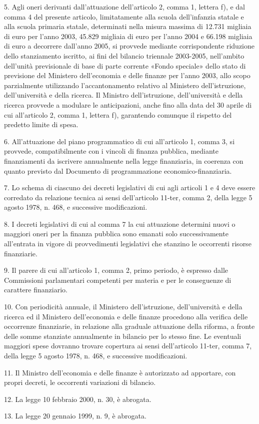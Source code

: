 5. Agli oneri derivanti dall'attuazione dell'articolo 2, comma 1, lettera f), e dal comma 4 del presente articolo, limitatamente alla scuola dell'infanzia statale e alla scuola primaria statale, determinati nella misura massima di 12.731 migliaia di euro per l'anno 2003, 45.829 migliaia di euro per l'anno 2004 e 66.198 migliaia di euro a decorrere dall'anno 2005, si provvede mediante corrispondente riduzione dello stanziamento iscritto, ai fini del bilancio triennale 2003-2005, nell'ambito dell'unità previsionale di base di parte corrente «Fondo speciale» dello stato di previsione del Ministero dell'economia e delle finanze per l'anno 2003, allo scopo parzialmente utilizzando l'accantonamento relativo al Ministero dell'istruzione, dell'università e della ricerca. Il Ministro dell'istruzione, dell'università e della ricerca provvede a modulare le anticipazioni, anche fino alla data del 30 aprile di cui all'articolo 2, comma 1, lettera f), garantendo comunque il rispetto del predetto limite di spesa.

6. All'attuazione del piano programmatico di cui all'articolo 1, comma 3, si provvede, compatibilmente con i vincoli di finanza pubblica, mediante finanziamenti da iscrivere annualmente nella legge finanziaria, in coerenza con quanto previsto dal Documento di programmazione economico-finanziaria.

7. Lo schema di ciascuno dei decreti legislativi di cui agli articoli 1 e 4 deve essere corredato da relazione tecnica ai sensi dell'articolo 11-ter, comma 2, della legge 5 agosto 1978, n. 468, e successive modificazioni.

8. I decreti legislativi di cui al comma 7 la cui attuazione determini nuovi o maggiori oneri per la finanza pubblica sono emanati solo successivamente all'entrata in vigore di provvedimenti legislativi che stanzino le occorrenti risorse finanziarie.

9. Il parere di cui all'articolo 1, comma 2, primo periodo, è espresso dalle Commissioni parlamentari competenti per materia e per le conseguenze di carattere finanziario.

10. Con periodicità annuale, il Ministero dell'istruzione, dell'università e della ricerca ed il Ministero dell'economia e delle finanze procedono alla verifica delle occorrenze finanziarie, in relazione alla graduale attuazione della riforma, a fronte delle somme stanziate annualmente in bilancio per lo stesso fine. Le eventuali maggiori spese dovranno trovare copertura ai sensi dell'articolo 11-ter, comma 7, della legge 5 agosto 1978, n. 468, e successive modificazioni.

11. Il Ministro dell'economia e delle finanze è autorizzato ad apportare, con propri decreti, le occorrenti variazioni di bilancio.

12. La legge 10 febbraio 2000, n. 30, è abrogata.

13. La legge 20 gennaio 1999, n. 9, è abrogata.